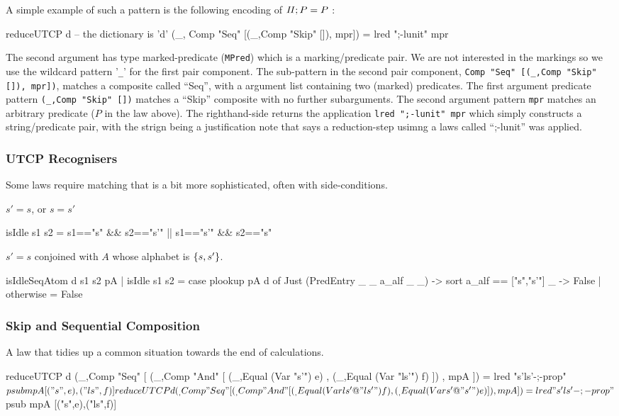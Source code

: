 A simple example of such a pattern is the following encoding
of $\mathit{II};P = P$ :
\begin{code}
reduceUTCP d   -- the dictionary is 'd'
  (_, Comp "Seq" [(_,Comp "Skip" []), mpr]) = lred ";-lunit" mpr
\end{code}
The second argument has type marked-predicate (\texttt{MPred})
which is a marking/predicate pair.
We are not interested in the markings
so we use the wildcard pattern '\verb"_"'
for the first pair component.
The sub-pattern in the second pair component,
\verb'Comp "Seq" [(_,Comp "Skip" []), mpr])',
matches a composite called ``Seq'',
with a argument list containing two (marked) predicates.
The first argument predicate pattern \verb'(_,Comp "Skip" [])'
matches a ``Skip'' composite with no further subarguments.
The second argument pattern \verb'mpr' matches an arbitrary predicate
($P$ in the law above).
The righthand-side returns the application \verb'lred ";-lunit" mpr'
which simply constructs a string/predicate pair,
with the strign being a justification note that says a reduction-step
usimng a laws called ``;-lunit'' was applied.



\subsubsection{UTCP Recognisers}

Some laws require matching that is a bit more sophisticated,
often with side-conditions.

$s'=s$, or $s=s'$
\begin{code}
isIdle s1 s2 = s1=="s" && s2=="s'" || s1=="s'" && s2=="s"
\end{code}
$s'=s$ conjoined with $A$ whose alphabet is $\{{s,s'}\}$.
\begin{code}
isIdleSeqAtom d s1 s2 pA
 | isIdle s1 s2
    = case plookup pA d of
       Just (PredEntry _ _ a_alf _ _)  ->  sort a_alf == ["s","s'"]
       _                               ->  False
 | otherwise  =  False
\end{code}




\subsubsection{Skip and Sequential Composition}


A law that tidies up a common situation towards
the end of calculations.
\begin{code}
reduceUTCP d (_,Comp "Seq"
                [ (_,Comp "And" [ (_,Equal (Var "s'") e)
                                , (_,Equal (Var "ls'") f) ])
                , mpA ])
 = lred "s'ls'-;-prop" $ psub mpA [("s",e),("ls",f)]
reduceUTCP d (_,Comp "Seq"
                [ (_,Comp "And" [ (_,Equal (Var ls'@"ls'") f)
                                , (_,Equal (Var s'@"s'") e) ])
                , mpA])
 = lred "s'ls'-;-prop" $ psub mpA [("s",e),("ls",f)]
\end{code}

